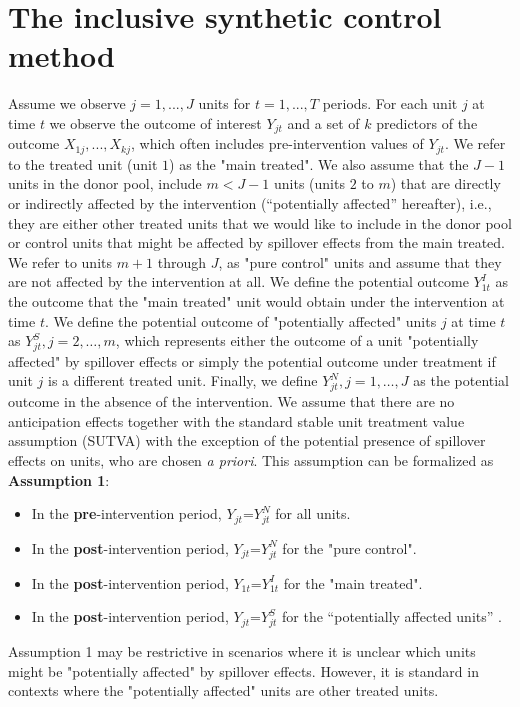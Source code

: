 \section{The inclusive synthetic control method}\label{iscm}
Assume we observe $j=1,...,J$ units for $t=1,...,T$ periods. For each unit $j$ at time $t$ we observe the outcome of interest $Y_{jt}$ and a set of $k$ predictors of the outcome $X_{1j},..., X_{kj}$, which often includes pre-intervention values of $Y_{jt}$. 
We refer to the treated unit (unit $1$) as the "main treated". We also assume that the $J-1$ units in the donor pool, include $m< J-1$ units (units $2$ to $m$) that are directly or indirectly affected by the intervention (``potentially affected'' hereafter), i.e., they are either other treated units that we would like to include in the donor pool or control units that might be affected by spillover effects from the main treated. We refer to units $m+1$ through $J$, as "pure control" units and assume that they are not affected by the intervention at all. 
We define the potential outcome  $Y_{1t}^I$ as the outcome that the "main treated" unit would obtain under the intervention at time $t$.  We define the potential outcome of "potentially affected" units $j$ at time $t$ as $Y_{jt}^S, j=2,\ldots,m$, which represents either the outcome of a unit "potentially affected" by spillover effects or simply the potential outcome under treatment if unit $j$ is a different treated unit.  
Finally, we define $Y_{jt}^N, j=1,\ldots,J$ as the potential outcome in the absence of the intervention. 
We assume that there are no anticipation effects together with the standard stable unit treatment value assumption (SUTVA) with the exception of the potential presence of spillover effects on units, who are chosen \textit{a priori}. This assumption can be formalized as
\textbf{Assumption 1}: 
\begin{itemize}
	\item In the \textbf{pre}-intervention period, $Y_{jt}$=$Y_{jt}^N$ for all units.
	\item In the \textbf{post}-intervention period, $Y_{jt}$=$Y_{jt}^N$ for the "pure control".
	\item In the \textbf{post}-intervention period, $Y_{1t}$=$Y_{1t}^I$ for the "main treated".
	\item In the \textbf{post}-intervention period, $Y_{jt}$=$Y_{jt}^S$ for the ``potentially affected units'' .
\end{itemize}
Assumption 1 may be restrictive in scenarios where it is unclear which units might be "potentially affected" by spillover effects. However, it is standard in contexts where the "potentially affected" units are other treated units.
